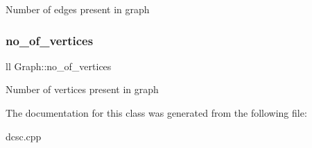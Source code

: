 Number of edges present in graph \mbox{\label{classGraph_a9b23a1ce91eceed3856b453858e61a05}} 
\subsubsection{\texorpdfstring{no\+\_\+of\+\_\+vertices}{no\_of\_vertices}}
{\footnotesize\ttfamily ll Graph\+::no\+\_\+of\+\_\+vertices}

Number of vertices present in graph 

The documentation for this class was generated from the following file\+:\begin{DoxyCompactItemize}
\item 
dcsc.\+cpp\end{DoxyCompactItemize}
